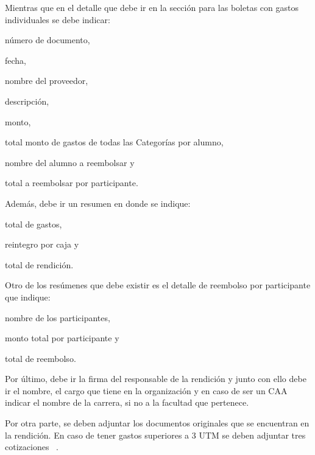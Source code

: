   Mientras que en el detalle que debe ir en la sección para las boletas con gastos individuales se debe indicar:
  \begin{enumerate*}[label=(\roman*)]
    \item número de documento,
    \item fecha,
    \item nombre del proveedor,
    \item descripción,
    \item monto,
    \item total monto de gastos de todas las Categorías por alumno,
    \item nombre del alumno a reembolsar y
    \item total a reembolsar por participante.
  \end{enumerate*}
  
  Además, debe ir un resumen en donde se indique:
  \begin{enumerate*}[label=(\roman*)]
    \item total de gastos,
    \item reintegro por caja y
    \item total de rendición.
  \end{enumerate*}
  
  Otro de los resúmenes que debe existir es el detalle de reembolso por participante que indique:
  \begin{enumerate*}[label=(\roman*)]
    \item nombre de los participantes,
    \item monto total por participante y
    \item total de reembolso.
  \end{enumerate*}
  
  Por último, debe ir la firma del responsable de la rendición y junto con ello debe ir el nombre, el cargo que tiene en la organización y en caso de ser un CAA indicar el nombre de la carrera, si no a la facultad que pertenece.
  
  Por otra parte, se deben adjuntar los documentos originales que se encuentran en la rendición. En caso de tener gastos superiores a 3 UTM se deben adjuntar tres cotizaciones ~\cite{5}.
  

  